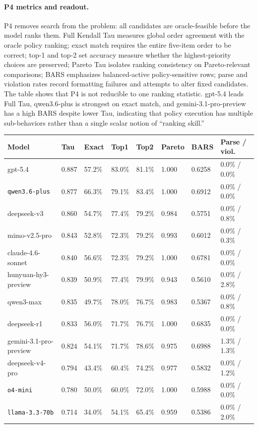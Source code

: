 \paragraph{P4 metrics and readout.}
P4 removes search from the problem: all candidates are oracle-feasible before the model ranks them. Full Kendall Tau measures global order agreement with the oracle policy ranking; exact match requires the entire five-item order to be correct; top-1 and top-2 set accuracy measure whether the highest-priority choices are preserved; Pareto Tau isolates ranking consistency on Pareto-relevant comparisons; BARS emphasizes balanced-active policy-sensitive rows; parse and violation rates record formatting failures and attempts to alter fixed candidates. The table shows that P4 is not reducible to one ranking statistic. gpt-5.4 leads Full Tau, qwen3.6-plus is strongest on exact match, and gemini-3.1-pro-preview has a high BARS despite lower Tau, indicating that policy execution has multiple sub-behaviors rather than a single scalar notion of ``ranking skill.''

\begin{center}
\label{tab:appendix_p4_full}
\scriptsize
\setlength{\tabcolsep}{3.5pt}
\renewcommand{\arraystretch}{1.08}
\begin{tabular}{llllllll}
\toprule
Model & Tau & Exact & Top1 & Top2 & Pareto & BARS & Parse / viol. \\
\midrule
gpt-5.4 & 0.887 & 57.2\% & 83.0\% & 81.1\% & 1.000 & 0.6258 & 0.0\% / 0.0\% \\
\texttt{qwen3.6-plus} & 0.877 & 66.3\% & 79.1\% & 83.4\% & 1.000 & 0.6912 & 0.0\% / 0.0\% \\
deepseek-v3 & 0.860 & 54.7\% & 77.4\% & 79.2\% & 0.984 & 0.5751 & 0.0\% / 0.8\% \\
mimo-v2.5-pro & 0.843 & 52.8\% & 72.3\% & 79.2\% & 0.993 & 0.6012 & 0.0\% / 0.3\% \\
claude-4.6-sonnet & 0.840 & 56.6\% & 72.3\% & 79.2\% & 1.000 & 0.6781 & 0.0\% / 0.0\% \\
hunyuan-hy3-preview & 0.839 & 50.9\% & 77.4\% & 79.9\% & 0.943 & 0.5610 & 0.0\% / 2.8\% \\
qwen3-max & 0.835 & 49.7\% & 78.0\% & 76.7\% & 0.983 & 0.5367 & 0.0\% / 0.8\% \\
deepseek-r1 & 0.833 & 56.0\% & 71.7\% & 76.7\% & 1.000 & 0.6835 & 0.0\% / 0.0\% \\
gemini-3.1-pro-preview & 0.824 & 54.1\% & 71.7\% & 78.6\% & 0.975 & 0.6988 & 1.3\% / 1.3\% \\
deepseek-v4-pro & 0.794 & 43.4\% & 60.4\% & 74.2\% & 0.977 & 0.5832 & 0.0\% / 1.2\% \\
\texttt{o4-mini} & 0.780 & 50.0\% & 60.0\% & 72.0\% & 1.000 & 0.5988 & 0.0\% / 0.0\% \\
\texttt{llama-3.3-70b} & 0.714 & 34.0\% & 54.1\% & 65.4\% & 0.959 & 0.5386 & 0.0\% / 2.0\% \\
\bottomrule
\end{tabular}
\end{center}

